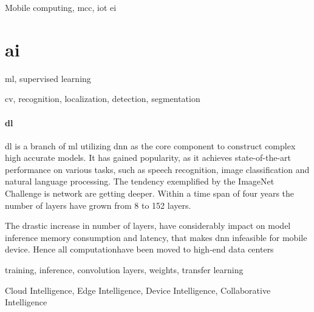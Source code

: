 Mobile computing, \gls{mcc}, \gls{iot} \gls{ei}

\section{\gls{ai}}

\gls{ml}, supervised learning

\gls{cv}, recognition, localization, detection, segmentation

\paragraph{\gls{dl}} 

\gls{dl} is a branch of \gls{ml} utilizing \gls{dnn} as the core component to construct complex high accurate models. It has gained popularity, as it achieves state-of-the-art performance on various tasks, such as speech recognition, image classification and natural language processing. The tendency exemplified by the ImageNet Challenge \cite{russakovsky_imagenet_2015} is network are getting deeper. Within a time span of four years the number of layers have grown from 8 to 152 layers. 

The drastic increase in number of layers, have considerably impact on model inference memory consumption and latency, that makes \gls{dnn} infeasible for mobile device. Hence all computationhave been moved to high-end data centers

training, inference, convolution layers, weights, transfer learning 


Cloud Intelligence, Edge Intelligence, Device Intelligence, Collaborative Intelligence


